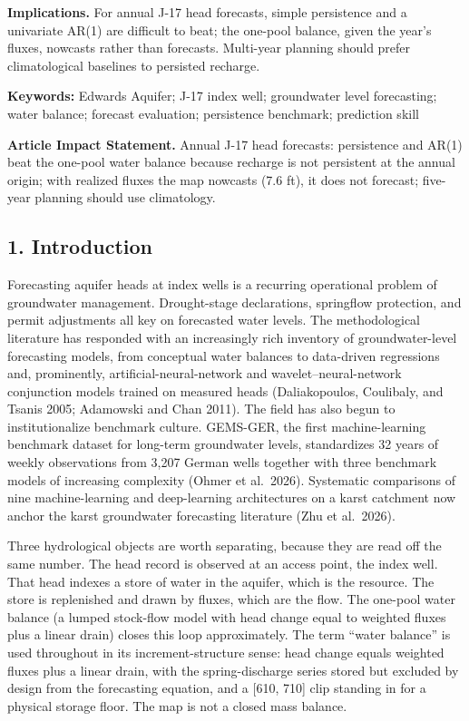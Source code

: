 \documentclass[11pt]{article}
\begin{document}
\textbf{Implications.} For annual J-17 head forecasts, simple
persistence and a univariate AR(1) are difficult to beat; the one-pool
balance, given the year's fluxes, nowcasts rather than forecasts.
Multi-year planning should prefer climatological baselines to persisted
recharge.

\textbf{Keywords:} Edwards Aquifer; J-17 index well; groundwater level
forecasting; water balance; forecast evaluation; persistence benchmark;
prediction skill

\textbf{Article Impact Statement.} Annual J-17 head forecasts:
persistence and AR(1) beat the one-pool water balance because recharge
is not persistent at the annual origin; with realized fluxes the map
nowcasts (7.6 ft), it does not forecast; five-year planning should use
climatology.

\subsection{1. Introduction}\label{introduction}

Forecasting aquifer heads at index wells is a recurring operational
problem of groundwater management. Drought-stage declarations,
springflow protection, and permit adjustments all key on forecasted
water levels. The methodological literature has responded with an
increasingly rich inventory of groundwater-level forecasting models,
from conceptual water balances to data-driven regressions and,
prominently, artificial-neural-network and wavelet--neural-network
conjunction models trained on measured heads (Daliakopoulos, Coulibaly,
and Tsanis 2005; Adamowski and Chan 2011). The field has also begun to
institutionalize benchmark culture. GEMS-GER, the first machine-learning
benchmark dataset for long-term groundwater levels, standardizes 32
years of weekly observations from 3,207 German wells together with three
benchmark models of increasing complexity (Ohmer et al.~2026).
Systematic comparisons of nine machine-learning and deep-learning
architectures on a karst catchment now anchor the karst groundwater
forecasting literature (Zhu et al.~2026).

Three hydrological objects are worth separating, because they are read
off the same number. The head record is observed at an access point, the
index well. That head indexes a store of water in the aquifer, which is
the resource. The store is replenished and drawn by fluxes, which are
the flow. The one-pool water balance (a lumped stock-flow model with
head change equal to weighted fluxes plus a linear drain) closes this
loop approximately. The term ``water balance'' is used throughout in its
increment-structure sense: head change equals weighted fluxes plus a
linear drain, with the spring-discharge series stored but excluded by
design from the forecasting equation, and a {[}610, 710{]} clip standing
in for a physical storage floor. The map is not a closed mass balance.
\end{document}
